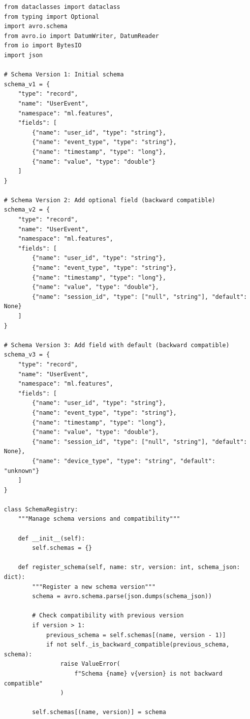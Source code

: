 \begin{lstlisting}[style=python, caption=Schema Evolution with Avro]
from dataclasses import dataclass
from typing import Optional
import avro.schema
from avro.io import DatumWriter, DatumReader
from io import BytesIO
import json

# Schema Version 1: Initial schema
schema_v1 = {
    "type": "record",
    "name": "UserEvent",
    "namespace": "ml.features",
    "fields": [
        {"name": "user_id", "type": "string"},
        {"name": "event_type", "type": "string"},
        {"name": "timestamp", "type": "long"},
        {"name": "value", "type": "double"}
    ]
}

# Schema Version 2: Add optional field (backward compatible)
schema_v2 = {
    "type": "record",
    "name": "UserEvent",
    "namespace": "ml.features",
    "fields": [
        {"name": "user_id", "type": "string"},
        {"name": "event_type", "type": "string"},
        {"name": "timestamp", "type": "long"},
        {"name": "value", "type": "double"},
        {"name": "session_id", "type": ["null", "string"], "default": None}
    ]
}

# Schema Version 3: Add field with default (backward compatible)
schema_v3 = {
    "type": "record",
    "name": "UserEvent",
    "namespace": "ml.features",
    "fields": [
        {"name": "user_id", "type": "string"},
        {"name": "event_type", "type": "string"},
        {"name": "timestamp", "type": "long"},
        {"name": "value", "type": "double"},
        {"name": "session_id", "type": ["null", "string"], "default": None},
        {"name": "device_type", "type": "string", "default": "unknown"}
    ]
}

class SchemaRegistry:
    """Manage schema versions and compatibility"""

    def __init__(self):
        self.schemas = {}

    def register_schema(self, name: str, version: int, schema_json: dict):
        """Register a new schema version"""
        schema = avro.schema.parse(json.dumps(schema_json))

        # Check compatibility with previous version
        if version > 1:
            previous_schema = self.schemas[(name, version - 1)]
            if not self._is_backward_compatible(previous_schema, schema):
                raise ValueError(
                    f"Schema {name} v{version} is not backward compatible"
                )

        self.schemas[(name, version)] = schema


\end{lstlisting}
